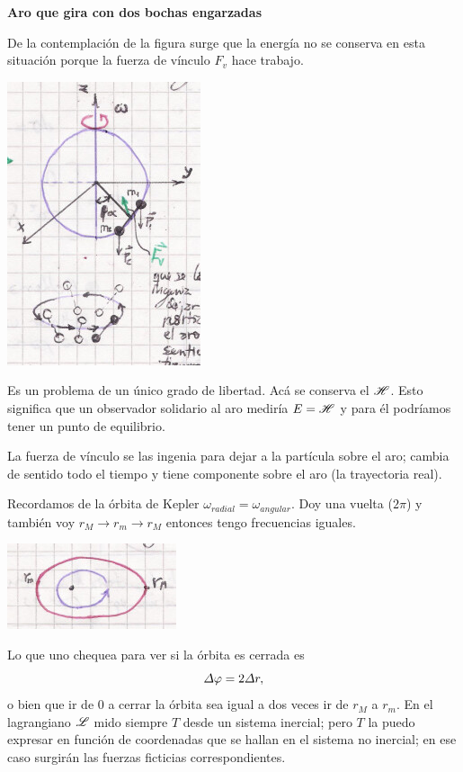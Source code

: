 \documentclass[10pt,oneside]{CBFT_book}
\begin{document}
\begin{ejemplo}{\bf Aro que gira con dos bochas engarzadas}

De la contemplación de la figura surge que la energía no se conserva en esta situación porque la fuerza de vínculo $F_v$ hace
trabajo.

\includegraphics[scale = 0.4]{images/fig_mc_problema_parcial_aro1.jpg}	 

Es un problema de un único grado de libertad. Acá se conserva el $\mathscr{H}$. Esto significa que un observador solidario al aro 
mediría $E=\mathscr{H}$ y para él podríamos tener un punto de equilibrio.

La fuerza de vínculo se las ingenia para dejar a la partícula sobre el aro; cambia de sentido todo el tiempo y tiene componente 
sobre el aro (la trayectoria real).

Recordamos de la órbita de Kepler $ \omega_{radial} = \omega_{angular}$.
Doy una vuelta ($2\pi$) y también voy $r_M \to r_m \to r_M$ entonces tengo frecuencias iguales.

\includegraphics[scale = 0.4]{images/fig_mc_problema_parcial_aro2.jpg}	 

Lo que uno chequea para ver si la órbita es cerrada es 
\[
	\Delta \varphi = 2 \Delta r,
\]
o bien que ir de 0 a cerrar la órbita sea igual a dos veces ir de $r_M$ a $r_m$.
En el lagrangiano $\mathscr{L}$ mido siempre $T$ desde un sistema inercial; pero $T$ la puedo expresar en función de coordenadas que se 
hallan en el sistema no inercial; en ese caso surgirán las fuerzas ficticias correspondientes.
\end{ejemplo}
\end{document}
